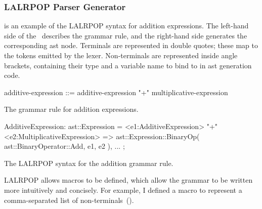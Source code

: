 \documentclass[00-main.tex]{subfiles}
\begin{document}
\subsubsection{LALRPOP Parser Generator}

 is an example of the LALRPOP syntax for addition expressions.
The left-hand side of the~\RustInline{=>} describes the grammar rule, and the right-hand side generates the corresponding \gls{ast} node.
Terminals are represented in double quotes; these map to the tokens emitted by the lexer.
Non-terminals are represented inside angle brackets, containing their type and a variable name to bind to in \gls{ast} generation code.

\begin{listing}[t]
  \begin{sublisting}[t]{\textwidth}
    \begin{GrammarListing}
      additive-expression ::= additive-expression "+" multiplicative-expression
    \end{GrammarListing}
    \caption{The grammar rule for addition expressions.}
    \label{sublst:addition expr grammar rule}
  \end{sublisting}
  \par\medskip %
  \begin{sublisting}[t]{\textwidth}
    \begin{RustListing}
      AdditiveExpression: ast::Expression = {
          <e1:AdditiveExpression> "+" <e2:MultiplicativeExpression>
              => ast::Expression::BinaryOp(
                  ast::BinaryOperator::Add,
                  e1,
                  e2
              ),
          ...
      };
    \end{RustListing}
    \caption{The LALRPOP syntax for the addition grammar rule.}
    \label{sublst:lalrpop syntax addition rule}
  \end{sublisting}
  \caption{%
    Example of the LALRPOP syntax for grammar rules.
     is the rule for an addition expression, and~ is the Rust code to represent it.
    In LALRPOP, the grammar parsing and \gls{ast} generation code are combined.\bigskip
  }
  \label{lst:AST generation code example}
\end{listing}

LALRPOP allows macros to be defined, which allow the grammar to be written more intuitively and concisely.
For example, I defined a macro to represent a comma-separated list of non-terminals~().
\end{document}
